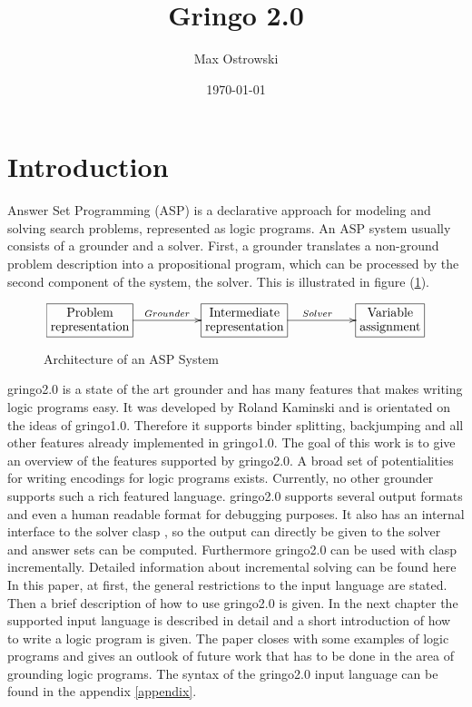 \documentclass[a4paper,10pt]{article}
\author{Max Ostrowski}
\title{Gringo 2.0}
\date{\today}
\begin{document}
\maketitle
\tableofcontents
\section{Introduction}
Answer Set Programming (ASP) \cite{baral02a} is a declarative approach for modeling and solving search problems, represented as logic programs.
An ASP system usually consists of a grounder and a solver.
First, a grounder translates a non-ground problem description into a propositional program, which can be processed by the second component of the system, the solver. This is illustrated in figure (\ref{fig:ASP}).
\begin{figure}[h]
\[
\xymatrix{*+[F]\txt{Problem\\representation}\ar[rr]^{Grounder}&&
		*+[F]\txt{Intermediate\\ representation} \ar[rr]^{Solver}&&
		*+[F]\txt{Variable\\ assignment}}
\]
\caption{Architecture of an ASP System}
\label{fig:ASP}
\end{figure}
gringo2.0 is a state of the art grounder and has many features that makes writing logic programs easy.
It was developed by Roland Kaminski and is orientated on the ideas of gringo1.0.
Therefore it supports binder splitting, backjumping and all other features already implemented in gringo1.0.\cite{gringopaper}
The goal of this work is to give an overview of the features supported by gringo2.0. A broad set of potentialities for writing encodings for logic programs exists. Currently, no other grounder supports such a rich featured language.
gringo2.0 supports several output formats and even a human readable format for debugging purposes.
It also has an internal interface to the solver clasp \cite{gekanesc07b}, so the output can directly be given to the solver and answer sets can be computed.
Furthermore gringo2.0 can be used with clasp incrementally. Detailed information about incremental solving can be found here \cite{gekaosscth08a} 
In this paper, at first, the general restrictions to the input language are stated. Then a brief description of how to use gringo2.0 is given.
In the next chapter the supported input language is described in detail and a short introduction of how to write a logic program is given. The paper closes with some examples of logic programs and gives an outlook of future work that has to be done in the area of grounding logic programs.
The syntax of the gringo2.0 input language can be found in the appendix \ref{appendix}.
\end{document}
